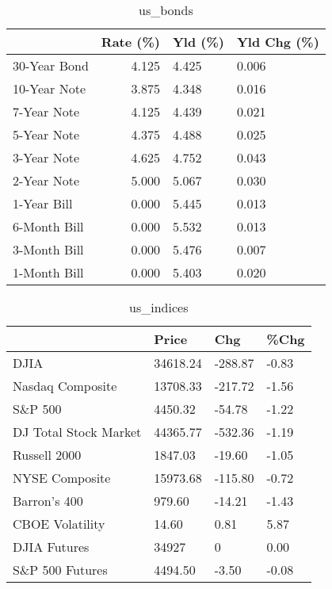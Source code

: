 \documentclass{article}%
\begin{document}
%


\begin{table}[htbp]%
\caption{us\_bonds}%
\centering%
\begin{adjustbox}{width=1\textwidth}%
\begin{tabular}{lrll}
\toprule
             &  Rate (\%) & Yld (\%) & Yld Chg (\%) \\
\midrule
30-Year Bond &     4.125 &   4.425 &       0.006 \\
10-Year Note &     3.875 &   4.348 &       0.016 \\
 7-Year Note &     4.125 &   4.439 &       0.021 \\
 5-Year Note &     4.375 &   4.488 &       0.025 \\
 3-Year Note &     4.625 &   4.752 &       0.043 \\
 2-Year Note &     5.000 &   5.067 &       0.030 \\
 1-Year Bill &     0.000 &   5.445 &       0.013 \\
6-Month Bill &     0.000 &   5.532 &       0.013 \\
3-Month Bill &     0.000 &   5.476 &       0.007 \\
1-Month Bill &     0.000 &   5.403 &       0.020 \\
\bottomrule
\end{tabular}
%
\end{adjustbox}%
\end{table}

%


\begin{table}[htbp]%
\caption{us\_indices}%
\centering%
\begin{adjustbox}{width=1\textwidth}%
\begin{tabular}{llll}
\toprule
                      &    Price &     Chg &  \%Chg \\
\midrule
                 DJIA & 34618.24 & -288.87 & -0.83 \\
     Nasdaq Composite & 13708.33 & -217.72 & -1.56 \\
              S\&P 500 &  4450.32 &  -54.78 & -1.22 \\
DJ Total Stock Market & 44365.77 & -532.36 & -1.19 \\
         Russell 2000 &  1847.03 &  -19.60 & -1.05 \\
       NYSE Composite & 15973.68 & -115.80 & -0.72 \\
         Barron's 400 &   979.60 &  -14.21 & -1.43 \\
      CBOE Volatility &    14.60 &    0.81 &  5.87 \\
         DJIA Futures &    34927 &       0 &  0.00 \\
      S\&P 500 Futures &  4494.50 &   -3.50 & -0.08 \\
\bottomrule
\end{tabular}
%
\end{adjustbox}%
\end{table}
\end{document}

